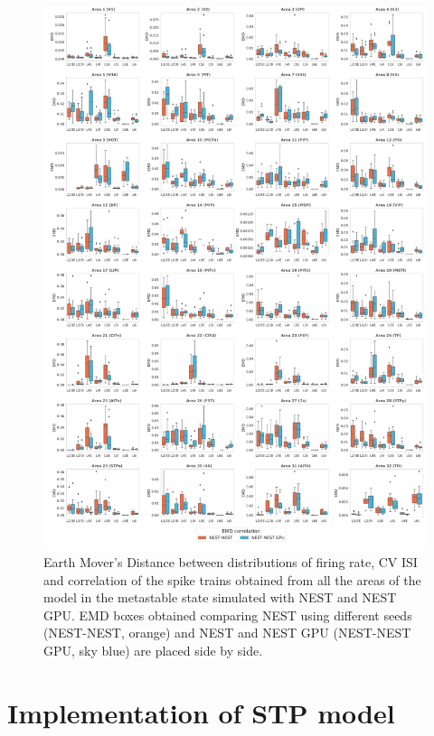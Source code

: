 \documentclass[a4paper, 12pt, twoside, openright]{book}
\begin{document}
\begin{figure}[H]
    \centering
    \includegraphics[width=\columnwidth]{figures/emd_boxplot_vert_ms_correlation.pdf}
    \caption{Earth Mover’s Distance between distributions of firing rate, CV ISI and correlation of the spike trains obtained from all the areas of the model in the metastable state simulated with NEST and NEST GPU. EMD boxes obtained comparing NEST using different seeds (NEST-NEST, orange) and NEST and NEST GPU (NEST-NEST GPU, sky blue) are placed side by side.}
    \label{fig:emd_ms}
\end{figure}



\chapter{Implementation of STP model}
\label{app:STP_implementation}
\end{document}

